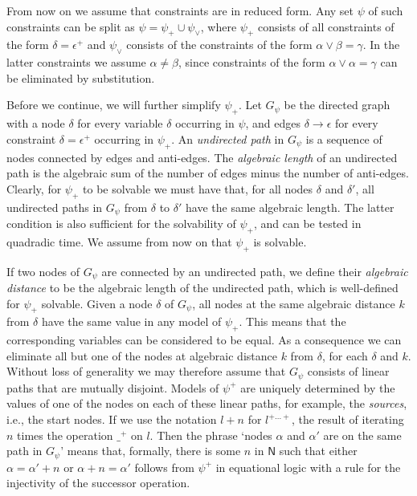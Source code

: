\documentclass[11pt,a4paper]{article}
\def\NN{\mathsf{N}}
\begin{document}
From now on we assume that constraints are in reduced form.
Any set $\psi$ of such constraints can be split as $ \psi= \psi_+ \cup  \psi_\vee$,
where $ \psi_+$ consists of all constraints of the form  
$\delta = \epsilon^+$ and $ \psi_\vee$ consists of the constraints of the form $\alpha\vee\beta = \gamma$.
In the latter constraints we assume $\alpha\neq\beta$, since constraints of the form
$\alpha \vee \alpha = \gamma$ can be eliminated by substitution.

Before we continue, we will further simplify $ \psi_+$.
Let $G_ \psi$ be the directed graph with a node $\delta$ for every
variable $\delta$ occurring in  $\psi$, and edges $\delta\to\epsilon$
for every constraint $\delta = \epsilon^+$ occurring in $ \psi_+$.
An \emph{undirected path} in $G_ \psi$ is a sequence of nodes connected
by edges and anti-edges.
The \emph{algebraic length} of an undirected path is the algebraic sum 
of the number of edges minus the number of anti-edges.
Clearly, for $ \psi_+$ to be solvable we must have that,
for all nodes $\delta$ and $\delta'$,
all undirected paths in $G_ \psi$ from $\delta$ to $\delta'$ have the same algebraic length.
The latter condition is also sufficient for the solvability of $ \psi_+$,
and can be tested in quadradic time. 
We assume from now on that $ \psi_+$ is solvable.

If two nodes of $G_ \psi$ are connected by an undirected path,
we define their \emph{algebraic distance} to be the algebraic length of
the undirected path, which is well-defined for $ \psi_+$ solvable. 
Given a node $\delta$ of $G_ \psi$, all nodes at the same algebraic distance $k$ from 
$\delta$ have the same value in any model of $ \psi_+$. 
This means that the corresponding variables can be considered to be equal.
As a consequence we can eliminate all but one of the nodes at 
algebraic distance $k$ from $\delta$, for each $\delta$ and $k$.
Without loss of generality we may therefore assume that $G_ \psi$ consists 
of linear paths that are mutually disjoint.
Models of $ \psi^+$ are uniquely determined by the values of 
one of the nodes on each of these linear paths, for example, the \emph{sources}, 
i.e., the start nodes. If we use the notation $l + n$ for $l^{+\ldots +}$, 
the result of iterating $n$ times the operation $\_^+$ on $l$. Then
the phrase `nodes $\alpha$ and $\alpha'$ are on the same path in $G_ \psi$'
means that, formally, there is some $n$ in $\NN$ such that
either $\alpha=\alpha'+n$ or $\alpha+n=\alpha'$ follows from $ \psi^+$
in equational logic with a rule for the injectivity of the successor operation.
\end{document}

